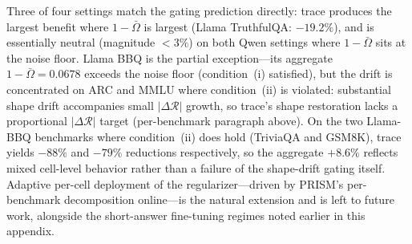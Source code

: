 Three of four settings match the gating prediction directly: trace produces the largest benefit where $1{-}\bar{\Omega}$ is largest (Llama TruthfulQA: $-19.2\%$), and is essentially neutral (magnitude $<3\%$) on both Qwen settings where $1{-}\bar{\Omega}$ sits at the noise floor. Llama BBQ is the partial exception---its aggregate $1{-}\bar{\Omega}=0.0678$ exceeds the noise floor (condition~(i) satisfied), but the drift is concentrated on ARC and MMLU where condition~(ii) is violated: substantial shape drift accompanies small $|\Delta\mathcal{R}|$ growth, so trace's shape restoration lacks a proportional $|\Delta\mathcal{R}|$ target (per-benchmark paragraph above). On the two Llama-BBQ benchmarks where condition~(ii) does hold (TriviaQA and GSM8K), trace yields $-88\%$ and $-79\%$ reductions respectively, so the aggregate $+8.6\%$ reflects mixed cell-level behavior rather than a failure of the shape-drift gating itself. Adaptive per-cell deployment of the regularizer---driven by PRISM's per-benchmark decomposition online---is the natural extension and is left to future work, alongside the short-answer fine-tuning regimes noted earlier in this appendix.

